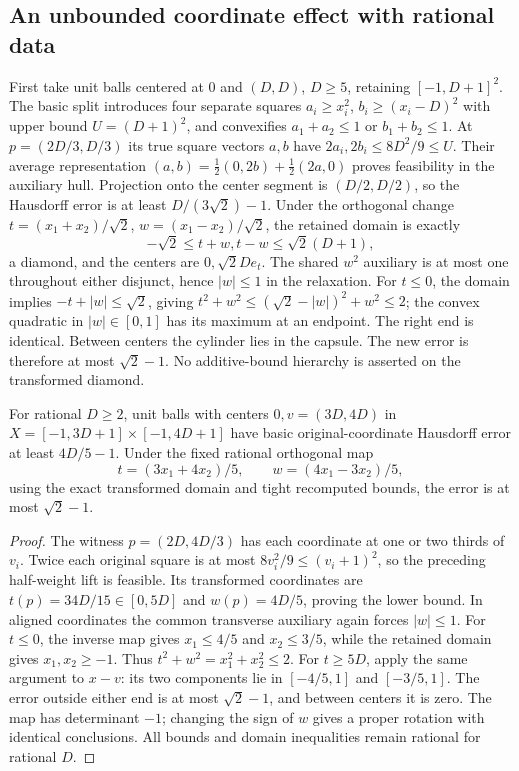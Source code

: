\subsection{An unbounded coordinate effect with rational data}
First take unit balls centered at $0$ and $(D,D)$, $D\ge5$, retaining
$[-1,D+1]^2$. The basic split introduces four separate squares
$a_i\ge x_i^2$, $b_i\ge(x_i-D)^2$ with upper bound $U=(D+1)^2$,
and convexifies $a_1+a_2\le1$ or $b_1+b_2\le1$.
At $p=(2D/3,D/3)$ its true square vectors $a,b$ have
$2a_i,2b_i\le8D^2/9\le U$. Their average representation
$(a,b)=\tfrac12(0,2b)+\tfrac12(2a,0)$ proves feasibility in the
auxiliary hull. Projection onto the center segment is $(D/2,D/2)$,
so the Hausdorff error is at least $D/(3\sqrt2)-1$.
Under the orthogonal change $t=(x_1+x_2)/\sqrt2$,
$w=(x_1-x_2)/\sqrt2$, the retained domain is exactly
\[
 -\sqrt2\le t+w,t-w\le\sqrt2(D+1),
\]
a diamond, and the centers are $0,\sqrt2D e_t$. The shared $w^2$
auxiliary is at most one throughout either disjunct, hence $|w|\le1$
in the relaxation. For $t\le0$, the domain implies
$-t+|w|\le\sqrt2$, giving
$t^2+w^2\le(\sqrt2-|w|)^2+w^2\le2$; the convex quadratic in
$|w|\in[0,1]$ has its maximum at an endpoint. The right end is
identical. Between centers the cylinder lies in the capsule. The new
error is therefore at most $\sqrt2-1$. No additive-bound hierarchy is
asserted on the transformed diamond.

\begin{proposition}\label{prop:psplit-rational}
For rational $D\ge2$, unit balls with centers $0,v=(3D,4D)$ in
$X=[-1,3D+1]\times[-1,4D+1]$ have basic original-coordinate Hausdorff
error at least $4D/5-1$. Under the fixed rational orthogonal map
\begin{equation}\label{eq:psplit-rational-map}
 t=(3x_1+4x_2)/5,\qquad w=(4x_1-3x_2)/5,
\end{equation}
using the exact transformed domain and tight recomputed bounds, the error
is at most $\sqrt2-1$.
\end{proposition}
\begin{proof}
The witness $p=(2D,4D/3)$ has each coordinate at one or two thirds of
$v_i$. Twice each original square is at most $8v_i^2/9\le(v_i+1)^2$,
so the preceding half-weight lift is feasible. Its transformed coordinates
are $t(p)=34D/15\in[0,5D]$ and $w(p)=4D/5$, proving the lower bound.
In aligned coordinates the common transverse auxiliary again forces
$|w|\le1$. For $t\le0$, the inverse map gives $x_1\le4/5$ and
$x_2\le3/5$, while the retained domain gives $x_1,x_2\ge-1$.
Thus $t^2+w^2=x_1^2+x_2^2\le2$. For $t\ge5D$, apply the same argument
to $x-v$: its two components lie in $[-4/5,1]$ and $[-3/5,1]$.
The error outside either end is at most $\sqrt2-1$, and between centers
it is zero. The map has determinant $-1$; changing the sign of $w$
gives a proper rotation with identical conclusions. All bounds and domain
inequalities remain rational for rational $D$.
\end{proof}

